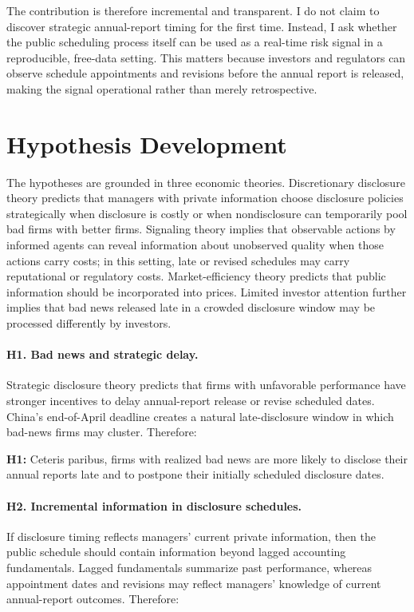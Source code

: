 \documentclass[10pt]{article}
\begin{document}
The contribution is therefore incremental and transparent. I do not claim to discover strategic annual-report timing for the first time. Instead, I ask whether the public scheduling process itself can be used as a real-time risk signal in a reproducible, free-data setting. This matters because investors and regulators can observe schedule appointments and revisions before the annual report is released, making the signal operational rather than merely retrospective.

\section{Hypothesis Development}

The hypotheses are grounded in three economic theories. Discretionary disclosure theory predicts that managers with private information choose disclosure policies strategically when disclosure is costly or when nondisclosure can temporarily pool bad firms with better firms. Signaling theory implies that observable actions by informed agents can reveal information about unobserved quality when those actions carry costs; in this setting, late or revised schedules may carry reputational or regulatory costs. Market-efficiency theory predicts that public information should be incorporated into prices. Limited investor attention further implies that bad news released late in a crowded disclosure window may be processed differently by investors.

\paragraph{H1. Bad news and strategic delay.}
Strategic disclosure theory predicts that firms with unfavorable performance have stronger incentives to delay annual-report release or revise scheduled dates. China's end-of-April deadline creates a natural late-disclosure window in which bad-news firms may cluster. Therefore:

\noindent \textbf{H1:} Ceteris paribus, firms with realized bad news are more likely to disclose their annual reports late and to postpone their initially scheduled disclosure dates.

\paragraph{H2. Incremental information in disclosure schedules.}
If disclosure timing reflects managers' current private information, then the public schedule should contain information beyond lagged accounting fundamentals. Lagged fundamentals summarize past performance, whereas appointment dates and revisions may reflect managers' knowledge of current annual-report outcomes. Therefore:
\end{document}
